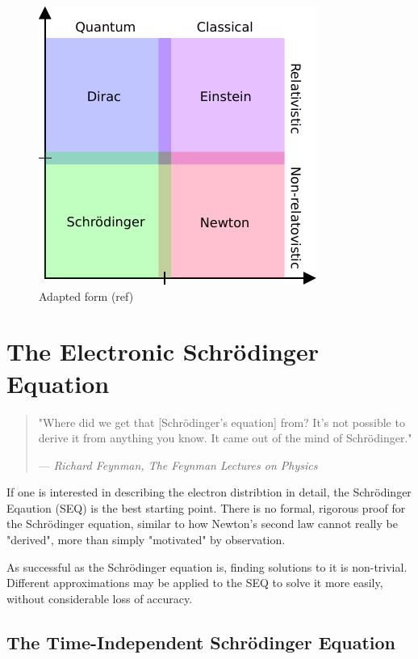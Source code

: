\begin{figure}
\centering
\includegraphics[scale=1.0]{Pics/dyneq}
\caption{Adapted form (ref)}
\end{figure}

\section{The Electronic Schrödinger Equation}

\begin{quote}
  "Where did we get that [Schrödinger's equation] from? It's not possible to derive it from anything you know. It came out of the mind of Schrödinger."
  \begin{flushright}
    \small{--- \textit{Richard Feynman, The Feynman Lectures on Physics}}
  \end{flushright}
\end{quote}

If one is interested in describing the electron distribtion in detail, the Schrödinger Eqaution (SEQ) is the best starting point. There is no formal, rigorous proof for the Schrödinger equation, similar to how Newton's second law cannot really be "derived", more than simply "motivated" by observation. 

As successful as the Schrödinger equation is, finding solutions to it is non-trivial. Different approximations may be applied to the SEQ to solve it more easily, without considerable loss of accuracy. 

\subsection{The Time-Independent Schrödinger Equation}

